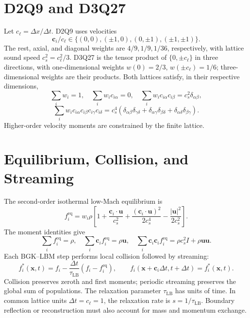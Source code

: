 \section{D2Q9 and D3Q27}
Let $c_\ell=\Delta x/\Delta t$. D2Q9 uses velocities
\[
\bm c_i/c_\ell\in\{(0,0),(\pm1,0),(0,\pm1),(\pm1,\pm1)\}.
\]
The rest, axial, and diagonal weights are
$4/9,1/9,1/36$, respectively, with lattice sound speed $c_s^2=c_\ell^2/3$.
D3Q27 is the tensor product of $\{0,\pm c_\ell\}$ in three directions,
with one-dimensional weights $w(0)=2/3$, $w(\pm c_\ell)=1/6$; three-dimensional weights are their products.
Both lattices satisfy, in their respective dimensions,
\[
\sum_iw_i=1,\quad \sum_iw_i c_{i\alpha}=0,\quad
\sum_iw_i c_{i\alpha}c_{i\beta}=c_s^2\delta_{\alpha\beta},
\]
\[
\sum_iw_i c_{i\alpha}c_{i\beta}c_{i\gamma}c_{i\delta}
=c_s^4(\delta_{\alpha\beta}\delta_{\gamma\delta}
+\delta_{\alpha\gamma}\delta_{\beta\delta}
+\delta_{\alpha\delta}\delta_{\beta\gamma}).
\]
Higher-order velocity moments are constrained by the finite lattice.

\section{Equilibrium, Collision, and Streaming}
The second-order isothermal low-Mach equilibrium is
\begin{equation}\label{eq:lbm-eq}
f_i^{\mathrm{eq}}=w_i\rho\left[
1+\frac{\bm c_i\cdot\bm u}{c_s^2}
+\frac{(\bm c_i\cdot\bm u)^2}{2c_s^4}
-\frac{|\bm u|^2}{2c_s^2}\right].
\end{equation}
The moment identities give
\[
\sum_if_i^{\mathrm{eq}}=\rho,\quad
\sum_i\bm c_if_i^{\mathrm{eq}}=\rho\bm u,\quad
\sum_i\bm c_i\bm c_if_i^{\mathrm{eq}}=\rho c_s^2I+\rho\bm u\bm u.
\]
Each BGK--LBM step performs local collision followed by streaming:
\begin{equation}\label{eq:lbe}
f_i^*(\bm x,t)=f_i-\frac{\Delta t}{\tau_{\mathrm{LB}}}(f_i-f_i^{\mathrm{eq}}),
\qquad
f_i(\bm x+\bm c_i\Delta t,t+\Delta t)=f_i^*(\bm x,t).
\end{equation}
Collision preserves zeroth and first moments; periodic streaming preserves the global sum of populations.
The relaxation parameter $\tau_{\mathrm{LB}}$ has units of time. In common lattice units $\Delta t=c_\ell=1$,
the relaxation rate is $s=1/\tau_{\mathrm{LB}}$. Boundary reflection or reconstruction must also account for mass and momentum exchange.

